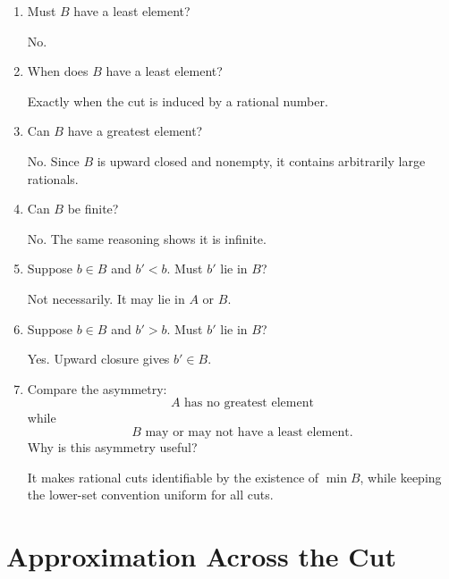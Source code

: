 \documentclass{self-check}
\begin{document}
\begin{enumerate}[label=\arabic*., itemsep=10pt]
\item Must $B$ have a least element?

\begin{answer}
No.
\end{answer}

\item When does $B$ have a least element?

\begin{answer}
Exactly when the cut is induced by a rational number.
\end{answer}

\item Can $B$ have a greatest element?

\begin{answer}
No. Since $B$ is upward closed and nonempty, it contains arbitrarily large rationals.
\end{answer}

\item Can $B$ be finite?

\begin{answer}
No. The same reasoning shows it is infinite.
\end{answer}

\item Suppose $b\in B$ and $b'<b$.
Must $b'$ lie in $B$?

\begin{answer}
Not necessarily. It may lie in $A$ or $B$.
\end{answer}

\item Suppose $b\in B$ and $b'>b$.
Must $b'$ lie in $B$?

\begin{answer}
Yes. Upward closure gives $b'\in B$.
\end{answer}

\item Compare the asymmetry:
\[
A\text{ has no greatest element}
\]
while
\[
B\text{ may or may not have a least element}.
\]
Why is this asymmetry useful?

\begin{answer}
It makes rational cuts identifiable by the existence of $\min B$, while keeping the lower-set convention uniform for all cuts.
\end{answer}

\end{enumerate}

\section{Approximation Across the Cut}
\end{document}
